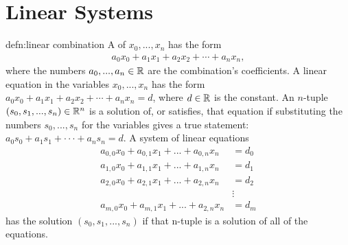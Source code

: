 \section{Linear Systems}

\begin{defn}{defn:linear combination}
A  of $x_0,..., x_n$ has the form 
\begin{align*}
a_0x_0 + a_1x_1 + a_2x_2 + \cdots + a_nx_n,
\end{align*}
where the numbers $a_0,..., a_n \in {\mathbb R}$ are the combination’s coefficients. A linear
equation in the variables $x_0,..., x_n$ has the form $a_0x_0 + a_1x_1 + a_2x_2 + \cdots +
a_nx_n = d$, where $d \in{\mathbb R}$ is the constant. An $n$-tuple $(s_0, s_1,..., s_n) \in{\mathbb R}^n$ is a solution of, or satisfies, that equation
if substituting the numbers $s_0,..., s_n$ for the variables gives a true statement: $a_0s_0 + a_1s_1 + · · · + a_ns_n = d$. A system of linear equations
\begin{align*}
a_{0,0}x_0 + a_{0,1}x_1 + ... + a_{0,n}x_n &= d_0 \\
a_{1,0}x_0 + a_{1,1}x_1 + ... + a_{1,n}x_n &= d_1 \\
a_{2,0}x_0 + a_{2,1}x_1 + ... + a_{2,n}x_n &= d_2 \\
&\vdots \\
a_{m,0}x_0 + a_{m,1}x_1 + ... + a_{2,n}x_n &= d_m
\end{align*}
has the solution $(s_0, s_1,..., s_n)$ if that n-tuple is a solution of all of the equations.
\end{defn}

